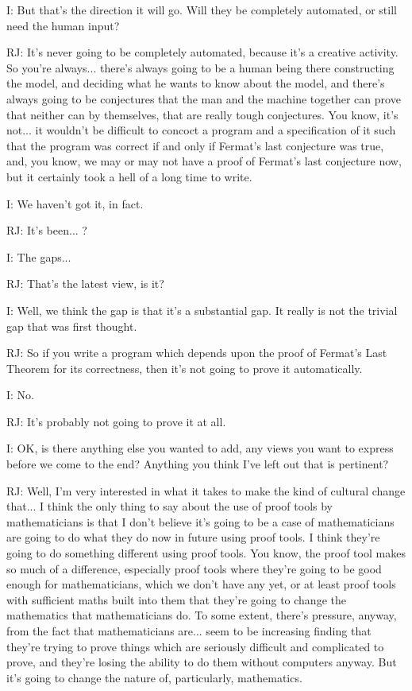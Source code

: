 \documentclass[10pt,titlepage]{book}
\begin{document}
I: But that's the direction it will go. Will they be completely automated, or still need the human input?

RJ: It's never going to be completely automated, because it's a creative activity. So you're always... there's always going to be a human being there constructing the model, and deciding what he wants to know about the model, and there's always going to be conjectures that the man and the machine together can prove that neither can by themselves, that are really tough conjectures. You know,  it's not... it wouldn't be difficult to concoct a program and a specification of it such that the program was correct if and only if Fermat's last conjecture was true, and, you know, we may or may not have a proof of Fermat's last conjecture now, but it certainly took a hell of a long time to write.

I: We haven't got it, in fact.

RJ: It's been... ?

I: The gaps...

RJ: That's the latest view, is it?

I: Well, we think the gap is that it's a substantial gap. It really is not the trivial gap that was first thought.

RJ: So if you write a program which depends upon the proof of Fermat's Last Theorem for its correctness, then it's not going to prove it automatically.

I: No.

RJ: It's probably not going to prove it at all.

I: OK, is there anything else you wanted to add, any views you want to express before we come to the end? Anything you think I've left out that is pertinent?

RJ: Well, I'm very interested in what it takes to make the kind of cultural change that... I think the only thing to say about the use of proof tools by mathematicians is that I don't believe it's going to be a case of mathematicians are going to do what they do now in future using proof tools. I think they're going to do something different using proof tools. You know, the proof tool makes so much of a difference, especially proof tools where they're going to be good enough for mathematicians, which we don't have any yet, or at least proof tools with sufficient maths built into them	that they're going to change the mathematics that mathematicians do. To some extent, there's pressure, anyway, from the fact that mathematicians are... seem to be increasing finding that they're trying to prove things which are seriously difficult and complicated to prove, and they're losing the ability to do them without computers anyway. But it's going to change the nature of, particularly, mathematics.
\end{document}
